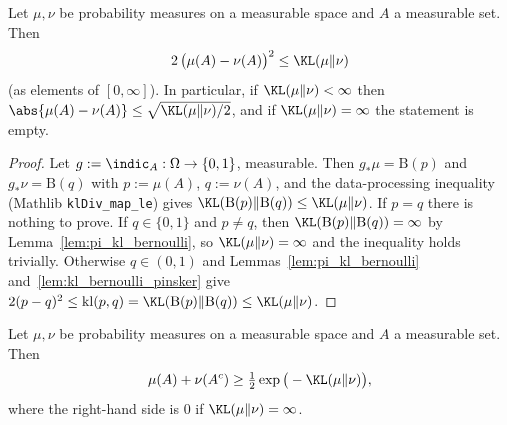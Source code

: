 \begin{lemma}\label{lem:pinsker}
\leanok
{}
Let $\mu, \nu$ be probability measures on a measurable space and $A$ a measurable set. Then
\[
  2\,\big(\mu(A) - \nu(A)\big)^2 \le \KL(\mu\|\nu)
\]
(as elements of $[0,\infty]$). In particular, if $\KL(\mu\|\nu) < \infty$ then
$\abs{\mu(A) - \nu(A)} \le \sqrt{\KL(\mu\|\nu)/2}$, and if $\KL(\mu\|\nu) = \infty$ the
statement is empty.
\end{lemma}

\begin{proof}
\leanok
{}
Let $g := \indic_A : \Omega \to \{0,1\}$, measurable. Then $g_*\mu = \mathrm{B}(p)$ and
$g_*\nu = \mathrm{B}(q)$ with $p := \mu(A)$, $q := \nu(A)$, and the data-processing inequality
(Mathlib \texttt{klDiv\_map\_le}) gives $\KL(\mathrm{B}(p)\|\mathrm{B}(q)) \le \KL(\mu\|\nu)$.
If $p = q$ there is nothing to prove. If $q \in \{0,1\}$ and $p \ne q$, then
$\KL(\mathrm{B}(p)\|\mathrm{B}(q)) = \infty$ by Lemma~\ref{lem:pi_kl_bernoulli}, so
$\KL(\mu\|\nu) = \infty$ and the inequality holds trivially. Otherwise $q \in (0,1)$ and
Lemmas~\ref{lem:pi_kl_bernoulli} and~\ref{lem:kl_bernoulli_pinsker} give
$2(p-q)^2 \le \mathrm{kl}(p,q) = \KL(\mathrm{B}(p)\|\mathrm{B}(q)) \le \KL(\mu\|\nu)$.
\end{proof}

\begin{lemma}\label{lem:bretagnolle_huber}
\leanok
Let $\mu, \nu$ be probability measures on a measurable space and $A$ a measurable set. Then
\[
  \mu(A) + \nu(A^c) \ge \tfrac12 \exp\big(-\KL(\mu\|\nu)\big),
\]
where the right-hand side is $0$ if $\KL(\mu\|\nu) = \infty$.
\end{lemma}

